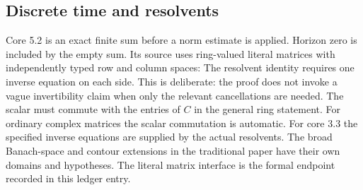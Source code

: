 \subsection{Discrete time and resolvents}
Core 5.2 is an exact finite sum before a norm estimate is applied. Horizon zero is included by the empty sum. Its source uses ring-valued literal matrices with independently typed row and column spaces:
The resolvent identity requires one inverse equation on each side. This is deliberate: the proof does not invoke a vague invertibility claim when only the relevant cancellations are needed. The scalar must commute with the entries of $C$ in the general ring statement.
For ordinary complex matrices the scalar commutation is automatic. For core 3.3 the specified inverse equations are supplied by the actual resolvents. The broad Banach-space and contour extensions in the traditional paper have their own domains and hypotheses. The literal matrix interface is the formal endpoint recorded in this ledger entry.
